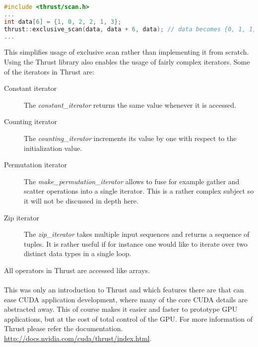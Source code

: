 \begin{lstlisting}[language=C,caption={Exclusive scan in Thrust},label=lst:thrust-scan]
#include <thrust/scan.h> 
...
int data[6] = {1, 0, 2, 2, 1, 3}; 
thrust::exclusive_scan(data, data + 6, data); // data becomes {0, 1, 1, 3, 5, 6}
...
\end{lstlisting}
This simplifies usage of exclusive scan rather than implementing it from scratch.
Using the Thrust library also enables the usage of fairly complex iterators.
Some of the iterators in Thrust are:
\begin{description}
	\item[Constant iterator] The \textit{constant\_iterator} returns the same value whenever it is accessed.
	\item[Counting iterator] The \textit{counting\_iterator} increments its value by one with respect to the initialization value.
	\item[Permutation iterator] The \textit{make\_permutation\_iterator} allows to fuse for example gather and scatter operations into a single iterator. This is a rather complex subject so it will not be discussed in depth here.
	\item[Zip iterator] The \textit{zip\_iterator} takes multiple input sequences and returns a sequence of tuples. It is rather useful if for instance one would like to iterate over two distinct data types in a single loop.
\end{description}
All operators in Thrust are accessed like arrays.
\\\\
This was only an introduction to Thrust and which features there are that can ease CUDA application development, where many of the core CUDA details are abstracted away.
This of course makes it easier and faster to prototype GPU applications, but at the cost of total control of the GPU.
For more information of Thrust please refer the documentation. \url{http://docs.nvidia.com/cuda/thrust/index.html}.